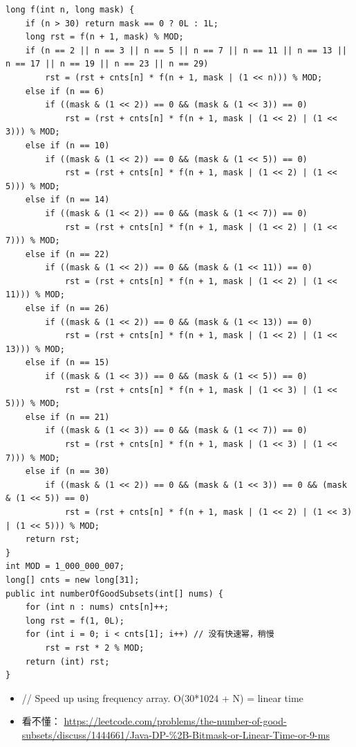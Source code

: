 \documentclass[9pt, b5paper]{article}
\begin{document}
\begin{verbatim}
long f(int n, long mask) {
    if (n > 30) return mask == 0 ? 0L : 1L;
    long rst = f(n + 1, mask) % MOD;
    if (n == 2 || n == 3 || n == 5 || n == 7 || n == 11 || n == 13 || n == 17 || n == 19 || n == 23 || n == 29) 
        rst = (rst + cnts[n] * f(n + 1, mask | (1 << n))) % MOD;
    else if (n == 6) 
        if ((mask & (1 << 2)) == 0 && (mask & (1 << 3)) == 0)
            rst = (rst + cnts[n] * f(n + 1, mask | (1 << 2) | (1 << 3))) % MOD;
    else if (n == 10) 
        if ((mask & (1 << 2)) == 0 && (mask & (1 << 5)) == 0)
            rst = (rst + cnts[n] * f(n + 1, mask | (1 << 2) | (1 << 5))) % MOD;
    else if (n == 14) 
        if ((mask & (1 << 2)) == 0 && (mask & (1 << 7)) == 0)
            rst = (rst + cnts[n] * f(n + 1, mask | (1 << 2) | (1 << 7))) % MOD;
    else if (n == 22) 
        if ((mask & (1 << 2)) == 0 && (mask & (1 << 11)) == 0)
            rst = (rst + cnts[n] * f(n + 1, mask | (1 << 2) | (1 << 11))) % MOD;
    else if (n == 26) 
        if ((mask & (1 << 2)) == 0 && (mask & (1 << 13)) == 0)
            rst = (rst + cnts[n] * f(n + 1, mask | (1 << 2) | (1 << 13))) % MOD;
    else if (n == 15) 
        if ((mask & (1 << 3)) == 0 && (mask & (1 << 5)) == 0)
            rst = (rst + cnts[n] * f(n + 1, mask | (1 << 3) | (1 << 5))) % MOD;
    else if (n == 21) 
        if ((mask & (1 << 3)) == 0 && (mask & (1 << 7)) == 0)
            rst = (rst + cnts[n] * f(n + 1, mask | (1 << 3) | (1 << 7))) % MOD;
    else if (n == 30) 
        if ((mask & (1 << 2)) == 0 && (mask & (1 << 3)) == 0 && (mask & (1 << 5)) == 0)
            rst = (rst + cnts[n] * f(n + 1, mask | (1 << 2) | (1 << 3) | (1 << 5))) % MOD;
    return rst;
}
int MOD = 1_000_000_007;
long[] cnts = new long[31];
public int numberOfGoodSubsets(int[] nums) {
    for (int n : nums) cnts[n]++;
    long rst = f(1, 0L);
    for (int i = 0; i < cnts[1]; i++) // 没有快速幂，稍慢
        rst = rst * 2 % MOD;
    return (int) rst;
}
\end{verbatim}
\begin{itemize}
\item // Speed up using frequency array. O(30*1024 + N) = linear time
\item 看不懂： \url{https://leetcode.com/problems/the-number-of-good-subsets/discuss/1444661/Java-DP-\%2B-Bitmask-or-Linear-Time-or-9-ms}
\end{itemize}
\end{document}
